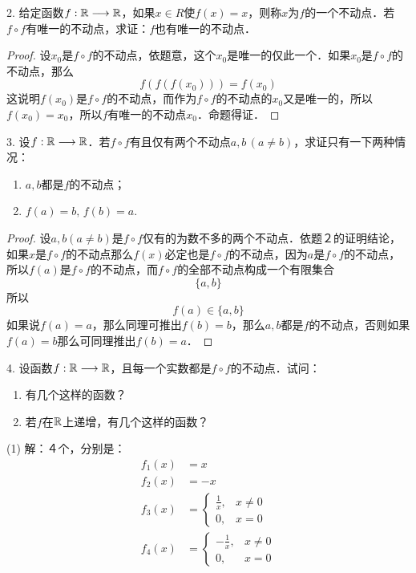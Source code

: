 2. 给定函数$f: \mathbb{R} \longrightarrow \mathbb{R}$，如果$x \in R$使$f(x)=x$，则称$x$为$f$的一个不动点．若$f \circ  f$有唯一的不动点，求证：$f$也有唯一的不动点．

\begin{proof}
设$x_0$是$f \circ f$的不动点，依题意，这个$x_0$是唯一的仅此一个．如果$x_0$是$f \circ f$的不动点，那么
\begin{equation}
    f(f(f(x_0))) = f(x_0)
\end{equation}
这说明$f(x_0)$是$f \circ f$的不动点，而作为$f \circ f$的不动点的$x_0$又是唯一的，所以$f(x_0) = x_0$，所以$f$有唯一的不动点$x_0$．命题得证．
\end{proof}

3. 设$f: \mathbb{R} \longrightarrow \mathbb{R}$．若$f \circ f$有且仅有两个不动点$a, b\,(a \neq b)$，求证只有一下两种情况：
\begin{enumerate}
    \item $a, b$都是$f$的不动点；
    \item $f(a) = b, \, f(b) = a$.
\end{enumerate}

\begin{proof}
设$a, b (a \neq b)$是$f \circ f$仅有的为数不多的两个不动点．依题２的证明结论，如果$x$是$f \circ f$的不动点那么$f(x)$必定也是$f \circ f$的不动点，因为$a$是$f \circ f$的不动点，所以$f(a)$是$f \circ f$的不动点，而$f \circ f$的全部不动点构成一个有限集合
\begin{equation}
    \{ a, b \}
\end{equation}
所以
\begin{equation}
    f(a) \in \{a, b \}
\end{equation}
如果说$f(a) = a$，那么同理可推出$f(b)=b$，那么$a, b$都是$f$的不动点，否则如果$f(a) = b$那么可同理推出$f(b)=a$．
\end{proof}

4. 设函数$f: \mathbb{R} \longrightarrow \mathbb{R}$，且每一个实数都是$f \circ f$的不动点．试问：
\begin{enumerate}
    \item 有几个这样的函数？
    \item 若$f$在$\mathbb{R}$上递增，有几个这样的函数？
\end{enumerate}

(1) 解：４个，分别是：
\begin{align}
    f_1(x) &= x \\
    f_2(x) &= -x \\
    f_3(x) &= \begin{cases}
        \displaystyle\frac{1}{x}, & x \neq 0 \\
        0, & x = 0
    \end{cases} \\
    f_4(x) &= \begin{cases}
        \displaystyle-\frac{1}{x}, & x \neq 0 \\
        0, & x = 0
    \end{cases}
\end{align}

